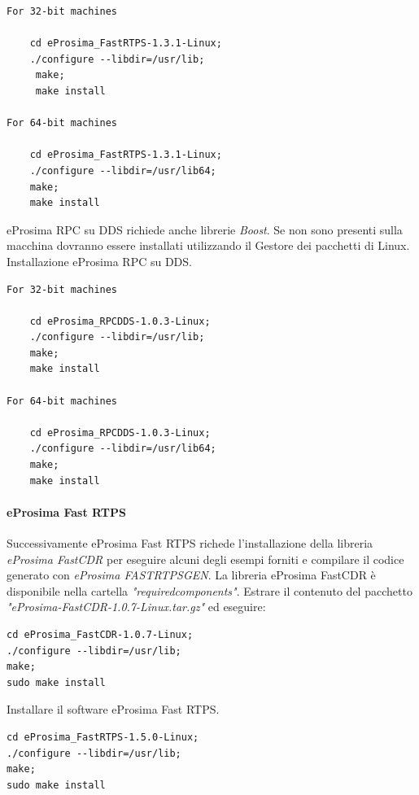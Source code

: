 \documentclass[a4paper]{article}
\begin{document}
\begin{verbatim}
For 32-bit machines

    cd eProsima_FastRTPS-1.3.1-Linux; 
    ./configure --libdir=/usr/lib;
     make; 
     make install

For 64-bit machines

    cd eProsima_FastRTPS-1.3.1-Linux;
    ./configure --libdir=/usr/lib64;
    make;
    make install

\end{verbatim}

eProsima RPC su DDS richiede anche librerie \textit{Boost}. Se non sono presenti sulla macchina dovranno essere installati utilizzando il  Gestore dei pacchetti di Linux.
Installazione  eProsima RPC su DDS.

\begin{verbatim}
For 32-bit machines

    cd eProsima_RPCDDS-1.0.3-Linux;
    ./configure --libdir=/usr/lib;
    make;
    make install

For 64-bit machines

    cd eProsima_RPCDDS-1.0.3-Linux;
    ./configure --libdir=/usr/lib64;
    make;
    make install
\end{verbatim}

\paragraph{eProsima Fast RTPS}
Successivamente eProsima Fast RTPS richede l'installazione della libreria \textit{eProsima FastCDR} per eseguire alcuni degli esempi forniti e compilare il codice generato con \textit{eProsima FASTRTPSGEN}.
La libreria eProsima FastCDR è disponibile nella cartella \textit{"requiredcomponents"}. Estrare il contenuto del pacchetto \textit{"eProsima-FastCDR-1.0.7-Linux.tar.gz"} ed eseguire:
\begin{verbatim}
cd eProsima_FastCDR-1.0.7-Linux;
./configure --libdir=/usr/lib;
make;
sudo make install
\end{verbatim}
Installare il software eProsima Fast RTPS.
\begin{verbatim}
cd eProsima_FastRTPS-1.5.0-Linux;
./configure --libdir=/usr/lib;
make;
sudo make install

\end{verbatim}
\end{document}

